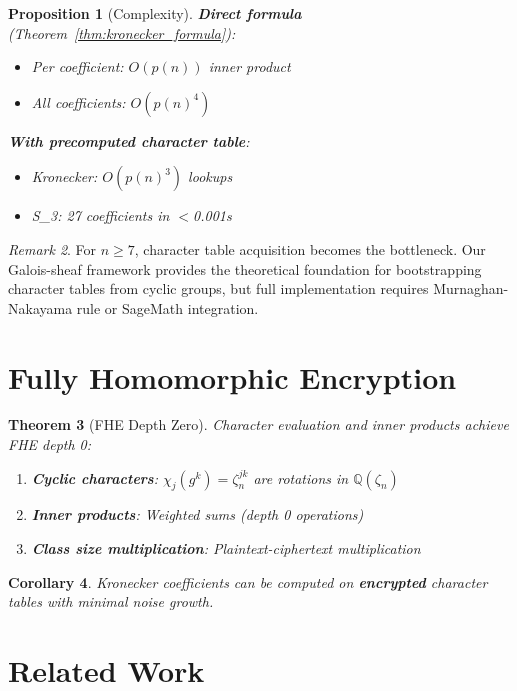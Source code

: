 \documentclass[11pt]{article}
\newtheorem{theorem}{Theorem}[section]
\newtheorem{corollary}[theorem]{Corollary}
\newtheorem{proposition}[theorem]{Proposition}
\theoremstyle{definition}
\theoremstyle{remark}
\newtheorem{remark}[theorem]{Remark}
\begin{document}
\begin{proposition}[Complexity]\label{prop:complexity}
\textbf{Direct formula} (Theorem~\ref{thm:kronecker_formula}):
\begin{itemize}
\item Per coefficient: $O(p(n))$ inner product
\item All coefficients: $O(p(n)^4)$
\end{itemize}

\textbf{With precomputed character table}:
\begin{itemize}
\item Kronecker: $O(p(n)^3)$ lookups
\item S_3: 27 coefficients in $<$0.001s
\end{itemize}
\end{proposition}

\begin{remark}
For $n \geq 7$, character table acquisition becomes the bottleneck. Our Galois-sheaf framework provides the theoretical foundation for bootstrapping character tables from cyclic groups, but full implementation requires Murnaghan-Nakayama rule or SageMath integration.
\end{remark}

\section{Fully Homomorphic Encryption}

\begin{theorem}[FHE Depth Zero]\label{thm:fhe_depth}
Character evaluation and inner products achieve FHE depth 0:
\begin{enumerate}
\item \textbf{Cyclic characters}: $\chi_j(g^k) = \zeta_n^{jk}$ are rotations in $\mathbb{Q}(\zeta_n)$
\item \textbf{Inner products}: Weighted sums (depth 0 operations)
\item \textbf{Class size multiplication}: Plaintext-ciphertext multiplication
\end{enumerate}
\end{theorem}

\begin{corollary}
Kronecker coefficients can be computed on \textbf{encrypted} character tables with minimal noise growth.
\end{corollary}

\section{Related Work}
\end{document}
